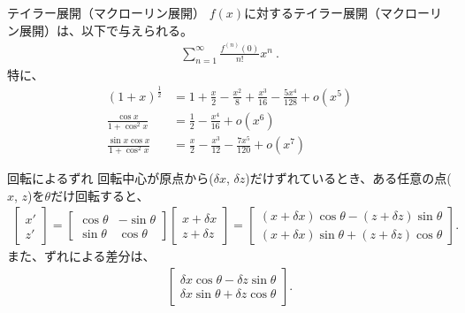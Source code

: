 


\begin{Formula}[label=formula:taylorexpansion]{テイラー展開（マクローリン展開）}
$f(x)$に対するテイラー展開（マクローリン展開）は、以下で与えられる。
\begin{align*}
  \sum_{n=1}^{\infty}\frac{f^{(n)}(0)}{n!}x^n\ .
\end{align*}
特に、
\begin{align*}
  (1+x)^\frac12 &= 1+\frac x2-\frac{x^2}8+\frac{x^3}{16}-\frac{5x^4}{128}+o\!\left(x^5\right)\\
  \frac{\cos x}{1+\cos^2x} &= \frac12-\frac{x^4}{16}+o\!\left(x^6\right)\\
  \frac{\sin x\cos x}{1+\cos^2x} &= \frac x2-\frac{x^3}{12}-\frac{7x^5}{120}+o\!\left(x^7\right)
\end{align*}
\end{Formula}



\begin{Formula}{回転によるずれ}
回転中心が原点から($\delta x$, $\delta z$)だけずれているとき、ある任意の点($x$, $z$)を$\theta$だけ回転すると、
\begin{align*}
  \left[
    \begin{array}{c}
      x'\\
      z'
    \end{array}
  \right]
  = \left[
    \begin{array}{cc}
      \cos\theta & -\sin\theta\\
      \sin\theta & \cos\theta
    \end{array}
  \right]\!\!
  \left[
    \begin{array}{c}
      x+\delta x\\
      z+\delta z
    \end{array}
  \right]
  = \left[
    \begin{array}{c}
      (x+\delta x)\cos\theta-(z+\delta z)\sin\theta\\
      (x+\delta x)\sin\theta+(z+\delta z)\cos\theta
    \end{array}
  \right].
\end{align*}
また、ずれによる差分は、
\begin{align*}
  \left[
    \begin{array}{c}
      \delta x\cos\theta-\delta z\sin\theta\\
      \delta x\sin\theta+\delta z\cos\theta
    \end{array}
  \right].
\end{align*}
\end{Formula}



